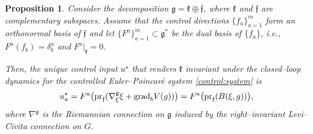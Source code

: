 \documentclass[letterpaper, 10 pt, conference]{ieeeconf}
\newtheorem{proposition}{Proposition}
\newcommand{\grad}{\normalfont{\text{grad}}}
\begin{document}
\begin{proposition}\label{orthogonal:input:thm2}
Consider the decomposition $\mathfrak{g} = \mathfrak{k} \oplus \mathfrak{f}$, 
where $\mathfrak{k}$ and $\mathfrak{f}$ are complementary subspaces. 
Assume that the control directions $\{f_a\}_{a=1}^m$ form an orthonormal basis of $\mathfrak{f}$ and let $\{F^a\}_{a=1}^m\subset \mathfrak{g}^*$ be the dual basis of $\{f_a\}$, i.e., 
$F^a(f_b)=\delta^a_b$ and $F^a|_{\mathfrak{k}}=0$.

Then, the unique control input $u^\star$ that renders $\mathfrak{k}$ invariant under the closed–loop dynamics for the controlled Euler–Poincaré system \eqref{control:system} is
\[
u^\star_a = F^a\big(\text{pr}_{\mathfrak{f}}(\nabla^{\mathfrak{g}}_\xi \xi + \grad_{b} V(g)) \big)= F^a\big(\text{pr}_{\mathfrak{f}}(B(\xi,g)) \big), 
\]
where $\nabla^{\mathfrak{g}}$ is the Riemannian connection on $\mathfrak{g}$ induced by the right–invariant Levi–Civita connection on $G$.
\end{proposition}
\end{document}
